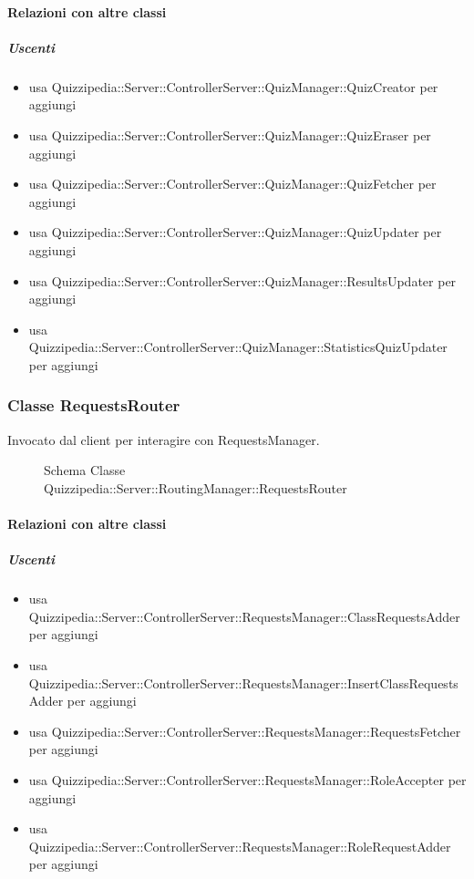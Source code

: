 \paragraph{Relazioni con altre classi}
\subparagraph{Uscenti}
\begin{itemize}
\item usa Quizzipedia::Server::ControllerServer::QuizManager::QuizCreator per aggiungi
\item usa Quizzipedia::Server::ControllerServer::QuizManager::QuizEraser per aggiungi
\item usa Quizzipedia::Server::ControllerServer::QuizManager::QuizFetcher per aggiungi
\item usa Quizzipedia::Server::ControllerServer::QuizManager::QuizUpdater per aggiungi
\item usa Quizzipedia::Server::ControllerServer::QuizManager::ResultsUpdater per aggiungi
\item usa Quizzipedia::Server::ControllerServer::QuizManager::StatisticsQuizUpdater per aggiungi
\end{itemize}
\subsubsection{Classe RequestsRouter}
Invocato dal client per interagire con RequestsManager.
\begin{figure}[H]
\centering
\noindent{}
\caption[Schema Classe RequestsRouter]{Schema Classe Quizzipedia::Server::RoutingManager::RequestsRouter}
\end{figure}
\paragraph{Relazioni con altre classi}
\subparagraph{Uscenti}
\begin{itemize}
\item usa Quizzipedia::Server::ControllerServer::RequestsManager::ClassRequestsAdder per aggiungi
\item usa Quizzipedia::Server::ControllerServer::RequestsManager::InsertClassRequestsAdder per aggiungi
\item usa Quizzipedia::Server::ControllerServer::RequestsManager::RequestsFetcher per aggiungi
\item usa Quizzipedia::Server::ControllerServer::RequestsManager::RoleAccepter per aggiungi
\item usa Quizzipedia::Server::ControllerServer::RequestsManager::RoleRequestAdder per aggiungi
\end{itemize}
